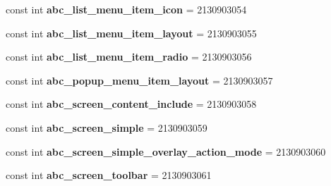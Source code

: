 \begin{DoxyCompactItemize}
\item 
\mbox{\label{class_sample_app_1_1_droid_1_1_resource_1_1_layout_a59b7193a4223becd4717843ded60fc5a}} 
const int {\bfseries abc\+\_\+list\+\_\+menu\+\_\+item\+\_\+icon} = 2130903054
\item 
\mbox{\label{class_sample_app_1_1_droid_1_1_resource_1_1_layout_a039738338da54b56a1fbcbad26d39d36}} 
const int {\bfseries abc\+\_\+list\+\_\+menu\+\_\+item\+\_\+layout} = 2130903055
\item 
\mbox{\label{class_sample_app_1_1_droid_1_1_resource_1_1_layout_aea52c030afc10a1f87ed05bc55197f72}} 
const int {\bfseries abc\+\_\+list\+\_\+menu\+\_\+item\+\_\+radio} = 2130903056
\item 
\mbox{\label{class_sample_app_1_1_droid_1_1_resource_1_1_layout_ae2342cc09a439c6b7560eb95c47e2611}} 
const int {\bfseries abc\+\_\+popup\+\_\+menu\+\_\+item\+\_\+layout} = 2130903057
\item 
\mbox{\label{class_sample_app_1_1_droid_1_1_resource_1_1_layout_a4687855bc628e2eeb2ec716febf127b0}} 
const int {\bfseries abc\+\_\+screen\+\_\+content\+\_\+include} = 2130903058
\item 
\mbox{\label{class_sample_app_1_1_droid_1_1_resource_1_1_layout_ac0517724961aaa860940ea89c9894c31}} 
const int {\bfseries abc\+\_\+screen\+\_\+simple} = 2130903059
\item 
\mbox{\label{class_sample_app_1_1_droid_1_1_resource_1_1_layout_aa3af0fdc11aca7451e8d7924973d19d1}} 
const int {\bfseries abc\+\_\+screen\+\_\+simple\+\_\+overlay\+\_\+action\+\_\+mode} = 2130903060
\item 
\mbox{\label{class_sample_app_1_1_droid_1_1_resource_1_1_layout_a2255c245ca7ab85aba11880e1cfaf55f}} 
const int {\bfseries abc\+\_\+screen\+\_\+toolbar} = 2130903061
\item 

\end{DoxyCompactItemize}
